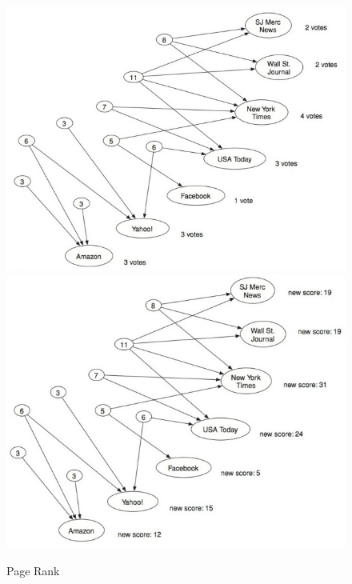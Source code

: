 \begin{figure}[!ht]
\centering
\includegraphics[width=0.8\linewidth]{images/ref/fig-14-2.jpeg}
\includegraphics[width=0.8\linewidth]{images/ref/fig-14-3.jpeg}
\caption{Page Rank}
\label{pageRankNews1}
\end{figure}

